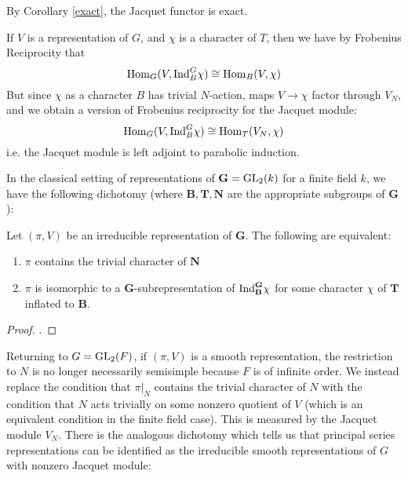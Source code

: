 By Corollary \ref{exact}, the Jacquet functor is exact.

If $V$ is a representation of $G$, and $\chi$ is a character of $T$, then we have by Frobenius Reciprocity that
\[\mathrm{Hom}_G(V, \mathrm{Ind}_B^G \chi) \cong \mathrm{Hom}_B(V, \chi)\]
But since $\chi$ as a character $B$ has trivial $N$-action, maps $V\to \chi$ factor through $V_N$, and we obtain a version of Frobenius reciprocity for the Jacquet module:
\[\mathrm{Hom}_G(V, \mathrm{Ind}_B^G \chi)\cong \mathrm{Hom}_T(V_N, \chi)\]
i.e. the Jacquet module is left adjoint to parabolic induction.

In the classical setting of representations of $\mathbf G=\mathrm{GL}_2(k)$ for a finite field $k$, we have the following dichotomy (where $\mathbf B,\mathbf T,\mathbf N$ are the appropriate subgroups of $\mathbf G$):
\begin{lemma}
    Let $(\pi,V)$ be an irreducible representation of $\mathbf G$. The following are equivalent:
    \begin{enumerate}
        \item $\pi$ contains the trivial character of $\mathbf N$
        \item $\pi$ is isomorphic to a $\mathbf G$-subrepresentation of $\mathrm{Ind}_{\mathbf B}^{\mathbf G} \chi$ for some character $\chi$ of $\mathbf T$ inflated to $\mathbf B$.
    \end{enumerate}
\end{lemma}
\begin{proof}
    \cite[Lemma 6.3]{BH1}.
\end{proof}

Returning to $G=\mathrm{GL}_2(F)$, if $(\pi,V)$ is a smooth representation, the restriction to $N$ is no longer necessarily semisimple because $F$ is of infinite order. We instead replace the condition that $\pi |_N$ contains the trivial character of $N$ with the condition that $N$ acts trivially on some nonzero quotient of $V$ (which is an equivalent condition in the finite field case). This is measured by the Jacquet module $V_N$. There is the analogous dichotomy which tells us that principal series representations can be identified as the irreducible smooth representations of $G$ with nonzero Jacquet module: 

